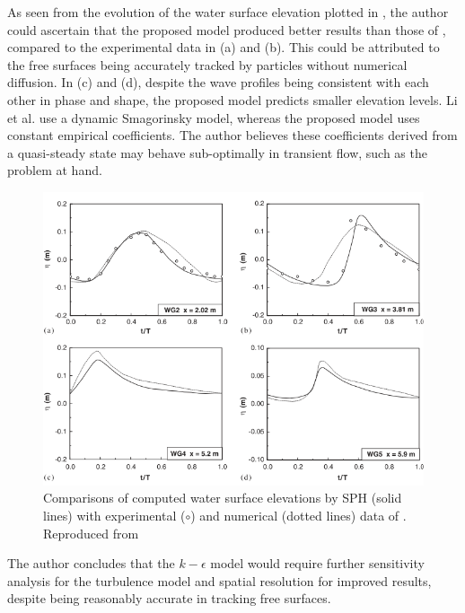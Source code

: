 As seen from the evolution of the water surface elevation plotted in , the author could ascertain that the proposed model produced better results than those of \cite{li2004wave}, compared to the experimental data in (a) and (b). This could be attributed to the free surfaces being accurately tracked by particles without numerical diffusion. 
In (c) and (d), despite the wave profiles being consistent with each other in phase and shape, the proposed model predicts smaller elevation levels. Li et al. use a dynamic Smagorinsky model, whereas the proposed model uses constant empirical coefficients. The author believes these coefficients derived from a quasi-steady state may behave sub-optimally in transient flow, such as the problem at hand.
\begin{figure}[htbp!]
    \centering
    \includegraphics[scale=0.9]{Figures/research_papers/Shao2006-water-surf-elevations.png}
    \caption{Comparisons of computed water surface elevations by SPH (solid lines) with experimental ($\circ$) and numerical (dotted lines) data of \cite{li2004wave}. Reproduced from \cite{Shao2006}}
    \label{fig:Shao2006-water-surf-elevations}
\end{figure}

The author concludes that the $k-\epsilon$ model would require further sensitivity analysis for the turbulence model and spatial resolution for improved results, despite being reasonably accurate in tracking free surfaces.

